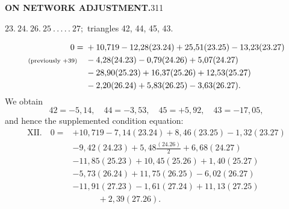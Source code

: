 \newpage
\noindent\textbf{ON NETWORK ADJUSTMENT.}\hfill311
\begin{center}
$23.\ 24.\ 26.\ 25\ .\,.\,.\,.\,.\ 27;$ triangles 42, 44, 45, 43.
\end{center}
\[
\begin{aligned}
0={}&+10{,}719-12{,}28(23.24)+25{,}51(23.25)-13{,}23(23.27)\\
\text{\scriptsize(previously $+39$)}\quad&-4{,}28(24.23)-0{,}79(24.26)+5{,}07(24.27)\\
&-28{,}90(25.23)+16{,}37(25.26)+12{,}53(25.27)\\
&-2{,}20(26.24)+5{,}83(26.25)-3{,}63(26.27).
\end{aligned}
\]
We obtain
\[
42=-5{,}14,\quad44=-3{,}53,\quad45=+5{,}92,\quad43=-17{,}05,
\]
and hence the supplemented condition equation:
\[
\begin{aligned}
\mathrm{XII.}\quad0={}&+10{,}719-7{,}14(23.24)+8{,}46(23.25)-1{,}32(23.27)\\
&-9{,}42(24.23)+5{,}48\frac{(24.26)}{2}+6{,}68(24.27)\\
&-11{,}85(25.23)+10{,}45(25.26)+1{,}40(25.27)\\
&-5{,}73(26.24)+11{,}75(26.25)-6{,}02(26.27)\\
&-11{,}91(27.23)-1{,}61(27.24)+11{,}13(27.25)\\
&\qquad\quad+2{,}39(27.26).
\end{aligned}
\]
